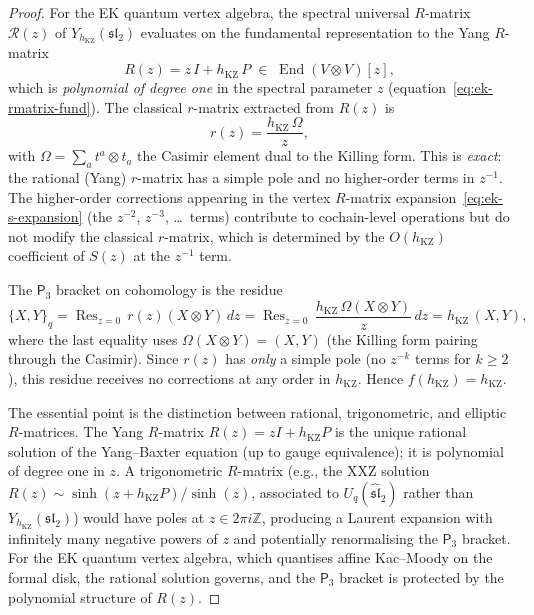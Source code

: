 \documentclass[11pt,reqno]{amsart}
\theoremstyle{definition}
\theoremstyle{remark}
\newcommand{\Pthree}{\mathsf{P}_{3}}
\DeclareMathOperator{\Res}{Res}
\DeclareMathOperator{\End}{End}
\newcommand{\ZZ}{\mathbb{Z}}
\numberwithin{equation}{section}
\begin{document}
\begin{proof}
For the EK quantum vertex algebra, the spectral
universal $R$-matrix $\mathcal{R}(z)$ of
$Y_{h_{\mathrm{KZ}}}(\mathfrak{sl}_2)$
evaluates on the fundamental representation to the
Yang $R$-matrix
\begin{equation}\label{eq:yang-rmatrix-exact}
  R(z) = z\,I + h_{\mathrm{KZ}}\,P
  \;\in\; \End(V \otimes V)[z],
\end{equation}
which is \emph{polynomial of degree one} in the
spectral parameter $z$
(equation~\eqref{eq:ek-rmatrix-fund}).
The classical $r$-matrix extracted from $R(z)$ is
\begin{equation}\label{eq:rational-rmatrix-exact}
  r(z) = \frac{h_{\mathrm{KZ}}\,\Omega}{z},
\end{equation}
with $\Omega = \sum_a t^a \otimes t_a$ the Casimir
element dual to the Killing form. This is
\emph{exact}: the rational (Yang) $r$-matrix has a
simple pole and no higher-order terms in $z^{-1}$.
The higher-order corrections appearing in the vertex
$R$-matrix expansion~\eqref{eq:ek-s-expansion}
(the $z^{-2}$, $z^{-3}$, \ldots\ terms) contribute
to cochain-level operations but do not modify the
classical $r$-matrix, which is determined by the
$O(h_{\mathrm{KZ}})$ coefficient of $S(z)$ at the
$z^{-1}$ term.

The $\Pthree$ bracket on cohomology is the residue
\begin{equation}\label{eq:p3-residue-exact}
  \{X, Y\}_q
  = \Res_{z=0}\,r(z)(X \otimes Y)\,dz
  = \Res_{z=0}\,
  \frac{h_{\mathrm{KZ}}\,\Omega(X \otimes Y)}{z}\,dz
  = h_{\mathrm{KZ}}\,(X, Y),
\end{equation}
where the last equality uses
$\Omega(X \otimes Y) = (X, Y)$ (the Killing form
pairing through the Casimir). Since $r(z)$ has
\emph{only} a simple pole (no $z^{-k}$ terms for
$k \geq 2$), this residue receives no corrections
at any order in $h_{\mathrm{KZ}}$. Hence
$f(h_{\mathrm{KZ}}) = h_{\mathrm{KZ}}$.

The essential point is the distinction between
rational, trigonometric, and elliptic $R$-matrices.
The Yang $R$-matrix
$R(z) = zI + h_{\mathrm{KZ}} P$
is the unique rational solution of the Yang--Baxter
equation (up to gauge equivalence); it is polynomial
of degree one in $z$. A trigonometric $R$-matrix
(e.g., the XXZ solution
$R(z) \sim \sinh(z + h_{\mathrm{KZ}} P)/\sinh(z)$,
associated to $U_q(\widehat{\mathfrak{sl}}_2)$
rather than $Y_{h_{\mathrm{KZ}}}(\mathfrak{sl}_2)$)
would have poles at $z \in 2\pi i\ZZ$, producing a
Laurent expansion with infinitely many negative
powers of $z$ and potentially renormalising the
$\Pthree$ bracket. For the EK quantum vertex
algebra, which quantises affine Kac--Moody on the
formal disk, the rational solution governs, and the
$\Pthree$ bracket is protected by the polynomial
structure of $R(z)$.


\end{proof}
\end{document}
